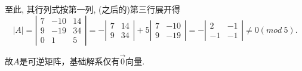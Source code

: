 \documentclass[a4paper]{book}
\begin{document}
至此, 其行列式按第一列, (之后的)第三行展开得
\begin{displaymath}
|A|=\left|\begin{array}{ccc}7&-10&14\\9&-19&34\\0&1&5\end{array}\right|=
-\left|\begin{array}{cc}7&14\\9&34\end{array}\right|+5\left|\begin{array}{cc}7&-10\\9&-19\end{array}\right|=-
\left|\begin{array}{cc}2&-1\\-1&-1\end{array}\right|\not=0(mod\ 5).\end{displaymath}

故$A$是可逆矩阵，基础解系仅有$\vec{0}$向量.
\end{document}
